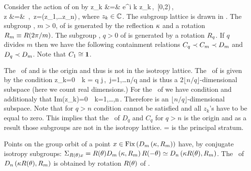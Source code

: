 \begin{example} %
 Consider the action of  on  by
 \bea
	\Rot{\theta} z_k &=& e^{i k \theta} z_k\,,\ \theta\in[0,2\pi)\,, \\
	\Refl z &=& \,,\  z=(z_1,\ldots z_n)\,,
	\label{eq:O2stndrd}
 \eea
where $z_k\in\mathbb{C}^{}$. The subgroup lattice is drawn in . The subgroup 
, $m>0$, of  is generated by the reflection $\kappa$ and a rotation $R_{m}\equiv R(2\pi/m)$. 
The subgroup , $q>0$ of  is generated by a rotation $R_{q}$.
If $q$ divides $m$ then we have the following containment relations $C_{q}\prec C_{m}\prec D_{m}$ 
and $D_{q}\prec D_{m}$. Note that $C_{1}\cong\mathbf{1}$.

The \fixedsp\ of  and  is the origin and thus  is not in the isotropy lattice. 
The \fixedsp\ of  is given by the condition
\beq
	z_k=0\ \ k = q j\,,\ j=1,\ldots\lfloor n/q \rfloor 
	\label{eq:O2CqFix}
\eeq
and is thus a $2 \lfloor n/q\rfloor$-dimensional subspace (here we count real dimensions.)  
For the \fixedsp\ of  we have condition  and additionaly that
\beq
	Im(z_k)=0\ \ k=1,\ldots,n\,.
\eeq 
Therefore  is an $ \lfloor n/q\rfloor$-dimensional subspace. Note that for $q>n$ condition
 cannot be satisfied and all $z_k$'s have to be equal to zero. This implies that the \fixedsp\ of $D_q$ and $C_q$ for $q>n$ is the origin and as a result those subgroups are not in the isotropy lattice. \Fix{\Idg}= is the principal stratum.

Points on the group orbit of a point  $x\in\mathrm{Fix}\left(D_{m}\left(\kappa,R_{m}\right)\right)$ have, by  conjugate
isotropy subgroups: $\Sigma_{R(\theta)x}=R(\theta)D_{m}\left(\kappa,R_{m}\right)R(-\theta)\simeq D_{n}\left(\kappa R(\theta),R_{m}\right)$. The \fixedsp\ of $D_{n}\left(\kappa R(\theta),R_{m}\right)$ is obtained by rotation $R(\theta)$ of .





\end{example}

